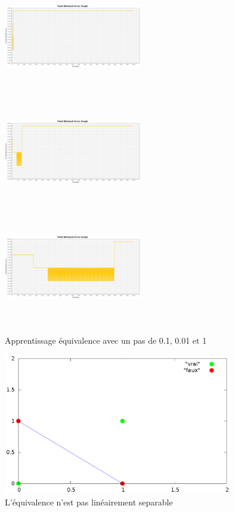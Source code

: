 \documentclass[twoside,openright,a4paper,11pt,french]{article}
\begin{document}
\begin{figure}[ht]
\centering
\includegraphics[width=6cm,height=5cm]{./pics/eq/mono_eq_0.1.eps}
\includegraphics[width=6cm,height=5cm]{./pics/eq/mono_eq_0.01.eps}
\includegraphics[width=6cm,height=5cm]{./pics/eq/mono_eq_0.001.eps}
\caption{Apprentissage équivalence avec un pas de 0.1, 0.01 et 1}
\label{fig:eqmono010010001}
\end{figure}

\begin{figure}[ht]
\centering
\includegraphics[width=10cm]{./pics/eqnonlin/eqlinsep.eps}
\caption{L'équivalence n'est pas linéairement separable}
\label{fig:eqnlin}
\end{figure}
\end{document}
